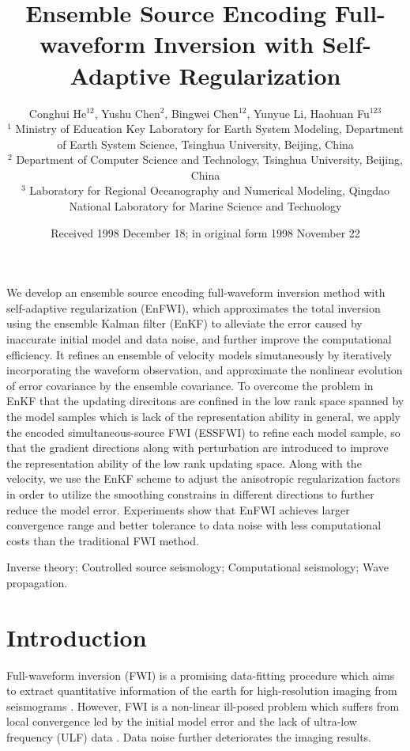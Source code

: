 \documentclass[mreferee]{gji}
\title[Geophys.\ J.\ Int.: \LaTeXe\ Guide for Authors]
	{Ensemble Source Encoding Full-waveform Inversion with Self-Adaptive Regularization}
\author[C. He]
  {Conghui He$^{12}$, Yushu Chen$^2$, Bingwei Chen$^{12}$, Yunyue Li, Haohuan Fu$^{123}$ \\
  $^1$ Ministry of Education Key Laboratory for Earth System Modeling, Department of Earth System Science, Tsinghua University, Beijing, China \\
  $^2$ Department of Computer Science and Technology, Tsinghua University, Beijing, China \\
  $^3$ Laboratory for Regional Oceanography and Numerical Modeling, Qingdao National Laboratory for Marine Science and Technology
  }
\date{Received 1998 December 18; in original form 1998 November 22}
\begin{document}
\label{firstpage}

\maketitle


\begin{summary}
We develop an ensemble source encoding full-waveform inversion method with self-adaptive regularization (EnFWI), which approximates the total inversion using the ensemble Kalman filter (EnKF) to alleviate the error caused by inaccurate initial model and data noise, and further improve the computational efficiency. It refines an ensemble of velocity models simutaneously by iteratively incorporating the waveform observation, and approximate the nonlinear evolution of error covariance by the ensemble covariance. To overcome the problem in EnKF that the updating direcitons are confined in the low rank space spanned by the model samples which is lack of the representation ability in general, we apply the encoded simultaneous-source FWI (ESSFWI) to refine each model sample, so that the gradient directions along with perturbation are introduced to improve the representation ability of the low rank updating space. Along with the velocity, we use the EnKF scheme to adjust the anisotropic regularization factors in order to utilize the smoothing constrains in different directions to further reduce the model error. Experiments show that EnFWI achieves larger convergence range and better tolerance to data noise with less computational costs than the traditional FWI method.
\end{summary}

\begin{keywords}
Inverse theory; Controlled source seismology; Computational seismology; Wave propagation.
\end{keywords}

\section{Introduction}

Full-waveform inversion (FWI) is a promising data-fitting procedure which aims to extract quantitative information of the earth for high-resolution imaging from seismograms \cite{ta84}. However, FWI is a non-linear ill-posed problem which suffers from local convergence led by the initial model error and the lack of ultra-low frequency (ULF) data \cite{vi}. Data noise further deteriorates the imaging results.
\end{document}
